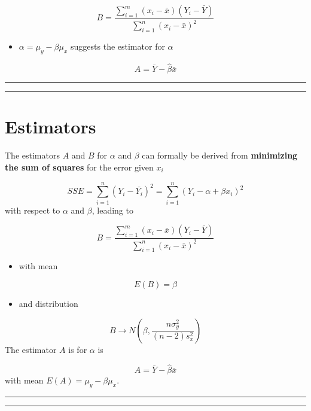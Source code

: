 \documentclass[
]{book}
\providecommand{\tightlist}{%
  \setlength{\itemsep}{0pt}\setlength{\parskip}{0pt}}
\begin{document}
\[B=\frac{\sum_{i=1}^m(x_i-\bar{x})(Y_i-\bar{Y})}{\sum_{i=1}^n(x_i-\bar{x})^2}\]

\begin{itemize}
\tightlist
\item
  \(\alpha=\mu_y-\beta\mu_x\) suggests the estimator for \(\alpha\)
\end{itemize}

\[A=\bar{Y}- \hat{\beta}\bar{x}\]

\begin{center}\rule{0.5\linewidth}{0.5pt}\end{center}

\begin{center}\rule{0.5\linewidth}{0.5pt}\end{center}

\hypertarget{estimators-2}{%
\section{Estimators}\label{estimators-2}}

The estimators \(A\) and \(B\) for \(\alpha\) and \(\beta\) can formally be derived from \textbf{minimizing the sum of squares} for the error given \(x_i\)

\[SSE=\sum_{i=1}^n(Y_i-\bar{Y_i})^2=\sum_{i=1}^n(Y_i-\alpha + \beta x_i)^2\]
with respect to \(\alpha\) and \(\beta\), leading to

\[B=\frac{\sum_{i=1}^m(x_i-\bar{x})(Y_i-\bar{Y})}{\sum_{i=1}^n(x_i-\bar{x})^2}\]

\begin{itemize}
\tightlist
\item
  with mean
\end{itemize}

\[E(B)=\beta\]

\begin{itemize}
\tightlist
\item
  and distribution
\end{itemize}

\[B \rightarrow N(\beta, \frac{n\sigma^2_y}{{(n-2)s^2_x}})\]
The estimator \(A\) is for \(\alpha\) is

\[A=\bar{Y}-\hat{\beta}\bar{x} \]
with mean \(E(A)=\mu_y-\beta\mu_x\).

\begin{center}\rule{0.5\linewidth}{0.5pt}\end{center}

\begin{center}\rule{0.5\linewidth}{0.5pt}\end{center}
\end{document}

